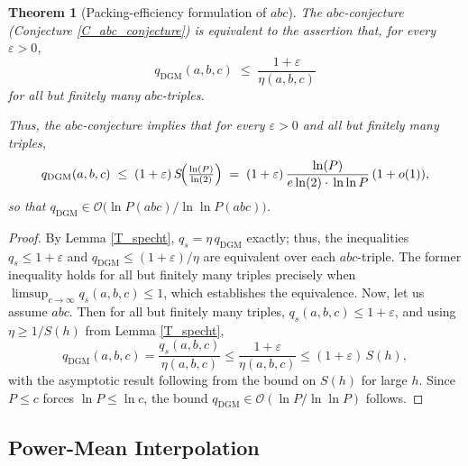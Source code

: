 \documentclass[11pt,letterpaper]{amsart}
\newtheorem{theorem}{Theorem}[section]
\begin{document}
  \begin{theorem}[Packing-efficiency formulation of $abc$]\label{T_abc_eta}
  The $abc$-conjecture (Conjecture \ref{C_abc_conjecture}) is equivalent to the assertion that, for every $\varepsilon>0$,
  \[
      q_{\mathrm{DGM}}(a,b,c)\;\le\;\frac{1+\varepsilon}{\eta(a,b,c)}
  \]
  for all but finitely many $abc$-triples.
  
  Thus, the $abc$-conjecture implies that for every $\varepsilon>0$ and all but finitely many triples,
  \[
      q_{\mathrm{DGM}}(a,b,c)\;\le\;(1+\varepsilon)\,S\!\Bigl(\tfrac{\ln (P)}{\ln (2)}\Bigr)
      \;=\;(1+\varepsilon)\,\frac{\ln (P)}{e\ln (2) \cdot \,\ln\ln P}\,(1+o(1)),
  \]
  so that $q_{\mathrm{DGM}} \in \mathcal{O}\!\bigl(\ln P(abc)/\ln\ln P(abc)\bigr)$.
  \end{theorem}

  \begin{proof}
  By Lemma \ref{T_specht}, $q_s=\eta\,q_{\mathrm{DGM}}$ exactly; thus, the inequalities $q_s\le 1+\varepsilon$ and $q_{\mathrm{DGM}}\le(1+\varepsilon)/\eta$ are equivalent over each $abc$-triple. The former inequality holds for all but finitely many triples precisely when $\limsup_{c\to\infty}q_s(a, b, c) \le 1$, which establishes the equivalence. Now, let us assume $abc$. Then for all but finitely many triples, $q_s(a,b,c) \le 1+\varepsilon$, and using $\eta\ge 1/S(h)$ from Lemma \ref{T_specht},
  \[
      q_{\mathrm{DGM}} (a, b, c)=\frac{q_s (a, b, c)}{\eta (a, b, c)}\le\frac{1+\varepsilon}{\eta (a, b, c)}\le(1+\varepsilon)\,S(h),
  \]
  with the asymptotic result following from the bound on $S(h)$ for large $h$. Since $P\le c$ forces $\ln P \leq \ln c$, the bound $q_{\mathrm{DGM}} \in \mathcal{O}(\ln P/\ln\ln P)$ follows.
  \end{proof}

  

  

\subsection{Power-Mean Interpolation}\label{S_qt_interpolation}
\end{document}
